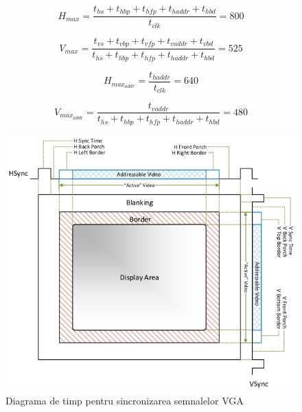 \documentclass[a4paper,11pt,romanian]{article}
\begin{document}
{ \[
  H_{max} = \frac{t_{hs} + t_{hbp} + t_{hfp} + t_{haddr} + t_{hbd}}{t_{clk}} = 800
 \]
 
 \[
  V_{max} = \frac{t_{vs} + t_{vbp} + t_{vfp} + t_{vaddr} + t_{vbd}}{t_{hs} + t_{hbp} + t_{hfp} + t_{haddr} + t_{hbd}} = 525
 \]
 
 \[
  H_{max_{addr}} = \frac{t_{haddr}}{t_{clk}} = 640
 \]
 
  \[
  V_{max_{addr}} = \frac{t_{vaddr}}{t_{hs} + t_{hbp} + t_{hfp} + t_{haddr} + t_{hbd}} = 480
 \]

 \begin{figure}
  \begin{center}
   \includegraphics[scale=0.5]{VESA_TimingDiagram.png}
   \caption{Diagrama de timp pentru sincronizarea semnalelor VGA}
   \label{fig:vgatiming}
  \end{center}
 \end{figure}
 
}
\end{document}
